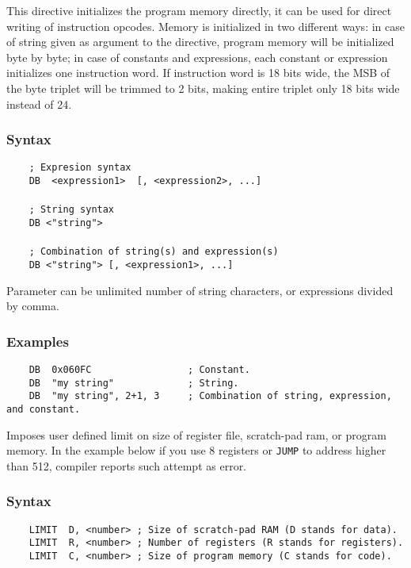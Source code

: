     \clearpage
        \label{DB}
        This directive initializes the program memory directly, it can be used for direct writing of instruction opcodes. Memory is initialized in two different ways: in case of string given as argument to the directive, program memory will be initialized byte by byte; in case of constants and expressions, each constant or expression initializes one instruction word. If instruction word is 18 bits wide, the MSB of the byte triplet will be trimmed to 2 bits, making entire triplet only 18 bits wide instead of 24.

        \subsubsection{Syntax}
            \verb'    ; Expresion syntax'\\
            \verb'    DB  <expression1>  [, <expression2>, ...]'\\
            \verb''\\
            \verb'    ; String syntax'\\
            \verb'    DB <"string">'\\
            \verb''\\
            \verb'    ; Combination of string(s) and expression(s)'\\
            \verb'    DB <"string"> [, <expression1>, ...]'

            Parameter can be unlimited number of string characters, or expressions divided by comma.


        \subsubsection{Examples}
            \verb'    DB  0x060FC                 ; Constant.'\\
            \verb'    DB  "my string"             ; String.'\\
            \verb'    DB  "my string", 2+1, 3     ; Combination of string, expression, and constant.'

        Imposes user defined limit on size of register file, scratch-pad ram, or program memory. In the example below if you use 8 registers or \texttt{JUMP} to address higher than 512, compiler reports such attempt as error.

        \subsubsection{Syntax}
            \verb'    LIMIT  D, <number> ; Size of scratch-pad RAM (D stands for data).'\\
            \verb'    LIMIT  R, <number> ; Number of registers (R stands for registers).'\\
            \verb'    LIMIT  C, <number> ; Size of program memory (C stands for code).'

